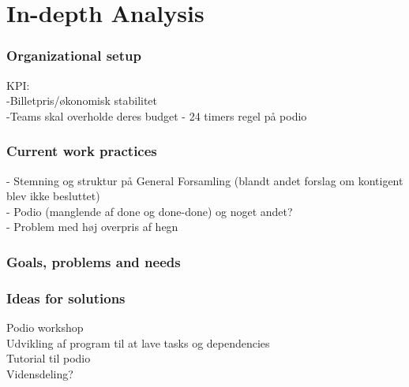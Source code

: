 \part{In-depth Analysis}

\section{Organizational setup}
KPI:\\
-Billetpris/økonomisk stabilitet\\
-Teams skal overholde deres budget
- 24 timers regel på podio
\section{Current work practices}
- Stemning og struktur på General Forsamling (blandt andet forslag om kontigent blev ikke besluttet)\\
- Podio (manglende af done og done-done) og noget andet?\\
- Problem med høj overpris af hegn\\

\section{Goals, problems and needs}

\section{Ideas for solutions}
Podio workshop\\
Udvikling af program til at lave tasks og dependencies\\
Tutorial til podio\\
Vidensdeling?\\


